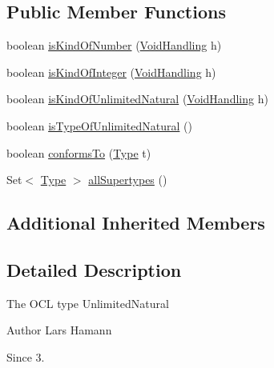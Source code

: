 \subsection*{Public Member Functions}
\begin{DoxyCompactItemize}
\item 
boolean \hyperlink{classorg_1_1tzi_1_1use_1_1uml_1_1ocl_1_1type_1_1_unlimited_natural_type_a7ebbf3097aac2aa1e0cd2e2fd81018db}{is\-Kind\-Of\-Number} (\hyperlink{enumorg_1_1tzi_1_1use_1_1uml_1_1ocl_1_1type_1_1_type_1_1_void_handling}{Void\-Handling} h)
\item 
boolean \hyperlink{classorg_1_1tzi_1_1use_1_1uml_1_1ocl_1_1type_1_1_unlimited_natural_type_a99b45c82bf1f6a4af6fd5c43d0865464}{is\-Kind\-Of\-Integer} (\hyperlink{enumorg_1_1tzi_1_1use_1_1uml_1_1ocl_1_1type_1_1_type_1_1_void_handling}{Void\-Handling} h)
\item 
boolean \hyperlink{classorg_1_1tzi_1_1use_1_1uml_1_1ocl_1_1type_1_1_unlimited_natural_type_a85758456d53cf5f4af732cbb83e9cf5b}{is\-Kind\-Of\-Unlimited\-Natural} (\hyperlink{enumorg_1_1tzi_1_1use_1_1uml_1_1ocl_1_1type_1_1_type_1_1_void_handling}{Void\-Handling} h)
\item 
boolean \hyperlink{classorg_1_1tzi_1_1use_1_1uml_1_1ocl_1_1type_1_1_unlimited_natural_type_a5e9c679bacdb428cf994f6e6b5ea4c67}{is\-Type\-Of\-Unlimited\-Natural} ()
\item 
boolean \hyperlink{classorg_1_1tzi_1_1use_1_1uml_1_1ocl_1_1type_1_1_unlimited_natural_type_a04cfd96c1489dafbdf08d85c79b04df9}{conforms\-To} (\hyperlink{interfaceorg_1_1tzi_1_1use_1_1uml_1_1ocl_1_1type_1_1_type}{Type} t)
\item 
Set$<$ \hyperlink{interfaceorg_1_1tzi_1_1use_1_1uml_1_1ocl_1_1type_1_1_type}{Type} $>$ \hyperlink{classorg_1_1tzi_1_1use_1_1uml_1_1ocl_1_1type_1_1_unlimited_natural_type_a7c3f0ddaeebe4536601e6e16ca2e5569}{all\-Supertypes} ()
\end{DoxyCompactItemize}
\subsection*{Additional Inherited Members}


\subsection{Detailed Description}
The O\-C\-L type Unlimited\-Natural \begin{DoxyAuthor}{Author}
Lars Hamann 
\end{DoxyAuthor}
\begin{DoxySince}{Since}
3. 
\end{DoxySince}


